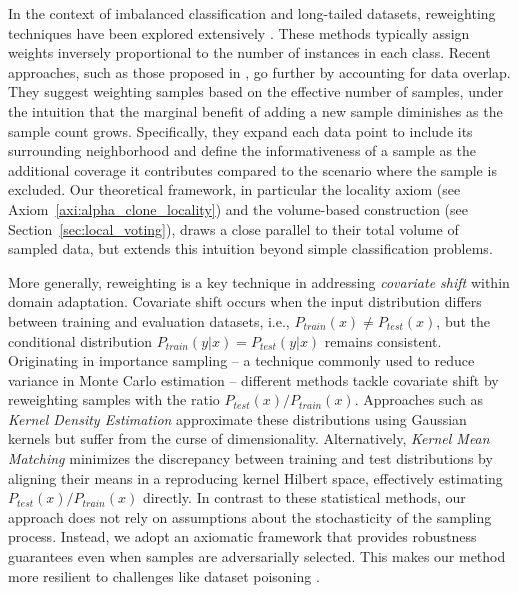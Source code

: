 In the context of imbalanced classification and long-tailed datasets, reweighting techniques have been explored extensively \cite{cao_learning_2019,dong_class_2017,gebru_fine-grained_2017}. These methods typically assign weights inversely proportional to the number of instances in each class. Recent approaches, such as those proposed in \cite{cui_class-balanced_2019}, go further by accounting for data overlap. They suggest weighting samples based on the effective number of samples, under the intuition that the marginal benefit of adding a new sample diminishes as the sample count grows. Specifically, they expand each data point to include its surrounding neighborhood and define the informativeness of a sample as the additional coverage %
it contributes compared to the scenario where the sample is excluded.
Our theoretical framework, in particular the locality axiom (see Axiom~\ref{axi:alpha_clone_locality}) and the volume-based construction 
(see Section~\ref{sec:local_voting}), draws a close parallel to their total volume of sampled data, but extends this intuition beyond simple classification problems.


More generally, reweighting is a key technique in addressing \emph{covariate shift} within domain adaptation. Covariate shift occurs when the input distribution differs between training and evaluation datasets, i.e., $P_{train}(x) \neq P_{test}(x)$, but the conditional distribution $P_{train}(y \vert x) = P_{test}(y \vert x)$ remains consistent. Originating in importance sampling -- a technique commonly used to reduce variance in Monte Carlo estimation -- different methods \cite{y_covariate_2019} tackle covariate shift by reweighting samples with the ratio $P_{test} (x) / P_{train}(x).$ Approaches such as \emph{Kernel Density Estimation} \cite{hardle_nonparametric_2004} approximate these distributions using Gaussian kernels but suffer from the curse of dimensionality. Alternatively, \emph{Kernel Mean Matching} \cite{gretton_covariate_2009} minimizes the discrepancy between training and test distributions by aligning their means in a reproducing kernel Hilbert space, effectively estimating $P_{test} (x) / P_{train}(x) $ directly.
In contrast to these statistical methods, our approach does not rely on assumptions about the stochasticity of the sampling process. Instead, we adopt an axiomatic framework that provides robustness guarantees even when samples are adversarially selected. This makes our method more resilient to challenges like dataset poisoning \cite{carlini_poisoning_2024}.







